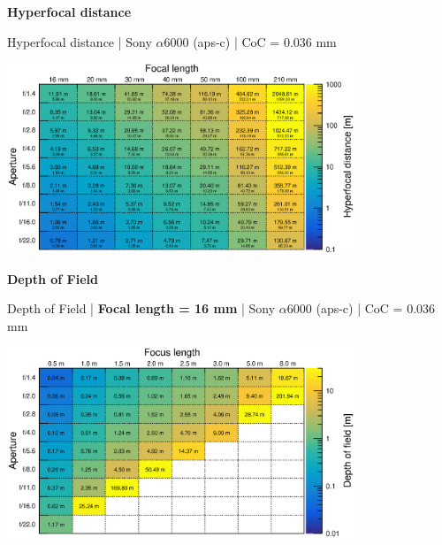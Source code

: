 \documentclass[aspectratio=169]{beamer}
\begin{document}

\begin{frame}[plain]{}
  \vspace{3ex}
  \begin{center} \LARGE \bf
    Hyperfocal distance
  \end{center}
\end{frame}

\begin{frame}[plain]{}
  \vspace{1ex}
  \centering
  Hyperfocal distance | Sony $\alpha$\hspace{0.1em}6000 (aps-c) | CoC = 0.036 mm
  
  \includegraphics[center,width=0.78\textwidth]{img/hyperfocal-distance.eps}
\end{frame}


\begin{frame}[plain]{}
  \vspace{3ex}
  \begin{center} \LARGE \bf
    Depth of Field
  \end{center}
\end{frame}

\begin{frame}[plain]{}
  \vspace{1ex}
  \centering
  Depth of Field | {\bf Focal length = 16 mm} |  Sony $\alpha$\hspace{0.1em}6000 (aps-c) | CoC = 0.036 mm
  
  \includegraphics[center,width=0.78\textwidth]{img/depth-of-field_focl16.eps}
\end{frame}
\end{document}

